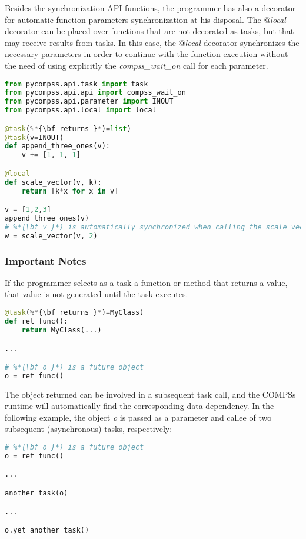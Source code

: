 Besides the synchronization API functions, the programmer has also a decorator for automatic function parameters synchronization 
at his disposal. The {\it $@$local} decorator can be placed over functions that are not decorated as tasks, but that may receive 
results from tasks. In this case, the {\it $@$local} decorator synchronizes the necessary parameters in order to continue with 
the function execution without the need of using explicitly the {\it compss\_wait\_on} call for each parameter.

\begin{lstlisting}[language=python]
from pycompss.api.task import task
from pycompss.api.api import compss_wait_on
from pycompss.api.parameter import INOUT
from pycompss.api.local import local

@task(%*{\bf returns }*)=list)
@task(v=INOUT)
def append_three_ones(v):
    v += [1, 1, 1]

@local
def scale_vector(v, k):
    return [k*x for x in v]

v = [1,2,3]
append_three_ones(v)
# %*{\bf v }*) is automatically synchronized when calling the scale_vector function.
w = scale_vector(v, 2)

\end{lstlisting}


\subsubsection{Important Notes}

If the programmer selects as a task a function or method that returns a value, that value is not 
generated until the task executes. 

\begin{lstlisting}[language=python]
@task(%*{\bf returns }*)=MyClass)
def ret_func():
    return MyClass(...)

...

# %*{\bf o }*) is a future object
o = ret_func()
\end{lstlisting}

The object returned can be involved in a subsequent task call, and the COMPSs runtime will automatically 
find the corresponding data dependency. In the following example, the object \textit{o} is passed as a parameter 
and callee of two subsequent (asynchronous) tasks, respectively:

\begin{lstlisting}[language=python]
# %*{\bf o }*) is a future object
o = ret_func()

...

another_task(o)

...

o.yet_another_task()
\end{lstlisting}

